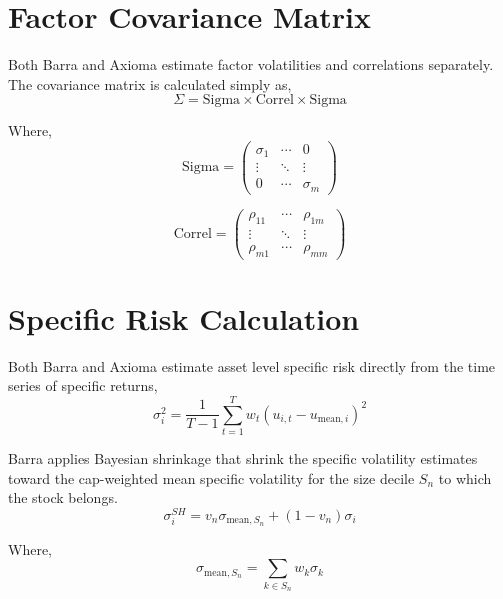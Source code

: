 \documentclass{article}
\begin{document}
\section*{Factor Covariance Matrix}
Both Barra and Axioma estimate factor volatilities and correlations separately. The covariance matrix is calculated simply as,
\begin{equation}
\Sigma = \text{Sigma} \times \text{Correl} \times \text{Sigma}
\end{equation}

Where,
\begin{equation}
\text{Sigma} = \begin{pmatrix}
\sigma_1 & \cdots & 0 \\
\vdots & \ddots & \vdots \\
0 & \cdots & \sigma_m
\end{pmatrix}
\end{equation}

\begin{equation}
\text{Correl} = \begin{pmatrix}
\rho_{11} & \cdots & \rho_{1m} \\
\vdots & \ddots & \vdots \\
\rho_{m1} & \cdots & \rho_{mm}
\end{pmatrix}
\end{equation}


\section*{Specific Risk Calculation}
Both Barra and Axioma estimate asset level specific risk directly from the time series of specific returns,
\begin{equation}
\sigma_i^2 = \frac{1}{T-1} \sum_{t=1}^{T} w_t \left( u_{i,t} - u_{\text{mean},i} \right)^2
\end{equation}

Barra applies Bayesian shrinkage that shrink the specific volatility estimates toward the cap-weighted mean specific volatility for the size decile \( S_n \) to which the stock belongs.
\begin{equation}
\sigma_i^{SH} = v_n \sigma_{\text{mean}, S_n} + (1 - v_n) \sigma_i
\end{equation}

Where, 
\begin{equation}
\sigma_{\text{mean}, S_n} = \sum_{k \in S_n} w_k \sigma_k
\end{equation}
\end{document}
